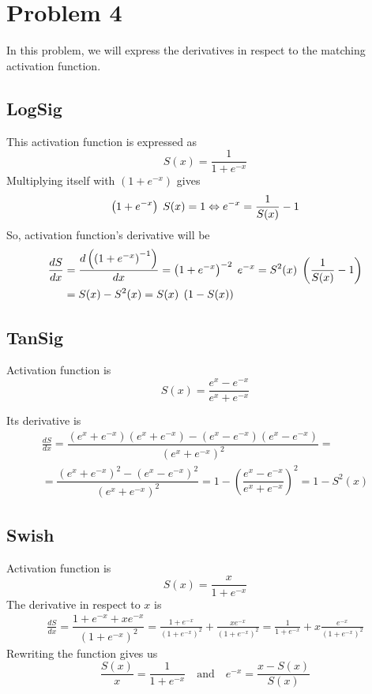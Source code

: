 \section{Problem 4}

In this problem, we will express the derivatives in respect to the matching activation function.

\subsection{LogSig}

This activation function is expressed as
\[
S(x) = \dfrac{1}{1 + e^{-x}}
\]
Multiplying itself with $\left(1 + e^{-x}\right)$ gives
\[
\left(1 + e^{-x}\right) \hspace{1mm} S(x) = 1 \Leftrightarrow e^{-x} = \frac{1}{S(x)} - 1
\]
So, activation function's derivative will be
\[
\begin{aligned}[c]
\dfrac{dS}{dx} &= \dfrac{d\left(\left(1+e^{-x}\right)^{-1}\right)}{dx} = \left(1+e^{-x}\right)^{-2} \hspace{1mm} e^{-x} = S^2(x) \hspace{1mm} \left(\dfrac{1}{S(x)} -1 \right) \\
&= S(x) - S^2(x) = S(x) \hspace{1mm} \left( 1 - S(x) \right)
\end{aligned}
\]

\subsection{TanSig}

Activation function is 
\[
S(x) = \dfrac{e^x - e^{-x}}{e^x + e^{-x}}
\]

Its derivative is 
\[
\begin{gathered}
\frac{dS}{dx} = \dfrac{\left(e^x +e^{-x} \right)\left(e^x +e^{-x} \right) - \left(e^x - e^{-x} \right)\left(e^x - e^{-x} \right)}{\left(e^x + e^{-x} \right)^2} = \\
= \dfrac{\left( e^x + e^{-x} \right)^2 - \left( e^x - e^{-x} \right)^2}{\left( e^x + e^{-x} \right)^2} = 1- \left(\dfrac{e^x - e^{-x}}{e^x + e^{-x}}\right)^2 = 1 - S^2(x)
\end{gathered}
\]

\subsection{Swish}

Activation function is
\[
S(x) = \dfrac{x}{1 + e^{-x}}
\]
The derivative in respect to $x$ is 
\[
\begin{gathered}
\frac{dS}{dx} = \dfrac{1 + e^{-x} + x e^{-x}}{\left( 1 + e^{-x} \right)^2} = \frac{1 + e^{-x}}{\left( 1 + e^{-x} \right)^2} + \frac{xe^{-x}}{\left( 1 + e^{-x} \right)^2} = \frac{1}{1+e^{-x}} + x \frac{e^{-x}}{\left( 1 + e^{-x} \right)^2}
\end{gathered}
\]
Rewriting the function gives us
\[
\frac{S(x)}{x} = \frac{1}{1 + e^{-x}} \quad \text{and} \quad e^{-x} = \frac{x-S(x)}{S(x)}
\]

